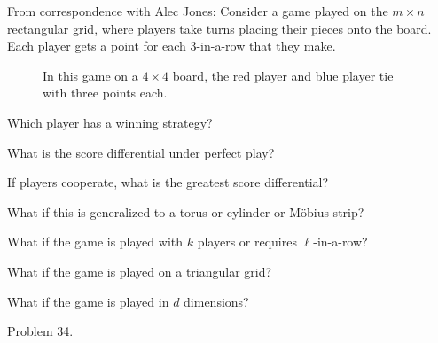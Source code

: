 \documentclass{article}
\begin{document}
From correspondence with Alec Jones: Consider a game played on the
$m \times n$ rectangular grid, where players take turns placing their pieces
onto the board. Each player gets a point for each 3-in-a-row that they make.
\begin{figure}[!h]
  \centering
  \caption{
    In this game on a $4 \times 4$ board, the red player and blue player tie with three points each.
  }
\end{figure}

\begin{question}
  Which player has a winning strategy?
\end{question}
\begin{related}
  \item What is the score differential under perfect play?
  \item If players cooperate, what is the greatest score differential?
  \item What if this is generalized to a torus or cylinder or M\"obius strip?
  \item What if the game is played with $k$ players or requires $\ell$-in-a-row?
  \item What if the game is played on a triangular grid?
  \item What if the game is played in $d$ dimensions?
\end{related}
\begin{references}
  \item Problem 34.
\end{references}
\end{document}
